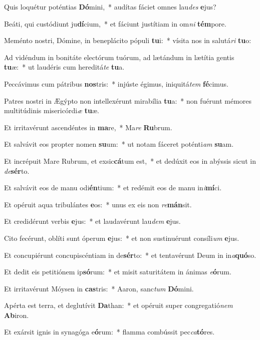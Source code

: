 \item Quis loquétur poténtias \textbf{Dó}mini,~* audítas fáciet omnes lau\textit{des} \textbf{e}jus?
\item Beáti, qui custódiunt ju\textbf{dí}cium,~* et fáciunt justítiam in om\textit{ni} \textbf{tém}pore.
\item Meménto nostri, Dómine, in beneplácito pópuli \textbf{tu}i:~* vísita nos in salutá\textit{ri} \textbf{tu}o:
\item Ad vidéndum in bonitáte electórum tuórum, ad lætándum in lætítia gentis \textbf{tu}æ:~* ut laudéris cum hereditá\textit{te} \textbf{tu}a.
\item Peccávimus cum pátribus \textbf{nos}tris:~* injúste égimus, iniquitá\textit{tem} \textbf{fé}cimus.
\item Patres nostri in Ægýpto non intellexérunt mirabília \textbf{tu}a:~* non fuérunt mémores multitúdinis misericórdi\textit{æ} \textbf{tu}æ.
\item Et irritavérunt ascendéntes in \textbf{ma}re,~* Ma\textit{re} \textbf{Ru}brum.
\item Et salvávit eos propter nomen \textbf{su}um:~* ut notam fáceret poténti\textit{am} \textbf{su}am.
\item Et incrépuit Mare Rubrum, et exsic\textbf{cá}tum est,~* et dedúxit eos in abýssis sicut in \textit{de}\textbf{sér}to.
\item Et salvávit eos de manu odi\textbf{én}tium:~* et redémit eos de manu in\textit{i}\textbf{mí}ci.
\item Et opéruit aqua tribulántes \textbf{e}os:~* unus ex eis non \textit{re}\textbf{mán}sit.
\item Et credidérunt verbis \textbf{e}jus:~* et laudavérunt lau\textit{dem} \textbf{e}jus.
\item Cito fecérunt, oblíti sunt óperum \textbf{e}jus:~* et non sustinuérunt consíli\textit{um} \textbf{e}jus.
\item Et concupiérunt concupiscéntiam in de\textbf{sér}to:~* et tentavérunt Deum in in\textit{a}\textbf{quó}so.
\item Et dedit eis petitiónem ip\textbf{só}rum:~* et misit saturitátem in ánimas \textit{e}\textbf{ó}rum.
\item Et irritavérunt Móysen in \textbf{cas}tris:~* Aaron, sanc\textit{tum} \textbf{Dó}mini.
\item Apérta est terra, et deglutívit \textbf{Da}than:~* et opéruit super congregatió\textit{nem} \textbf{Ab}iron.
\item Et exársit ignis in synagóga e\textbf{ó}rum:~* flamma combússit pec\textit{ca}\textbf{tó}res.
